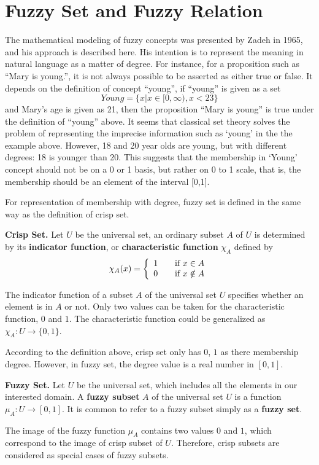 \section{Fuzzy Set and Fuzzy Relation}
\label{sec:FSAFR}
The mathematical modeling of fuzzy concepts was presented by Zadeh in 1965, and his approach is described here. His intention is to represent the meaning in natural language as a matter of degree. For instance, for a proposition such as ``Mary is young.'', it is not always possible to be asserted as either true or false. It depends on the definition of concept ``young'', if ``young'' is given as a set
\[Young = \{x|x \in [0,\infty), x<23\}\]
and Mary's age is given as 21, then the proposition ``Mary is young'' is true under the definition of ``young'' above. It seems that classical set theory solves the problem of representing the imprecise information such as `young' in the the example above. However, 18 and 20 year olds are young, but with different degrees: 18 is younger than 20. This suggests that the membership in `Young' concept should not be on a 0 or 1 basis, but rather on 0 to 1 scale, that is, the membership should be an element of the interval [0,1].

For representation of membership with degree, fuzzy set is defined in the same way as the definition of crisp set.

\begin{defin} \textbf{Crisp Set.} 
\label{def:CrispSet}
Let $U$ be the universal set, an ordinary subset $A$ of $U$ is determined by its \textbf{indicator function}, or \textbf{characteristic function} $\chi_A$ defined by
\[
  \chi_A(x) = \left\{ 
  \begin{array}{l l}
    1 & \quad \text{if $x \in A$}\\
    0 & \quad \text{if $x \notin A$}\\
  \end{array} \right.
\]
\end{defin}
The indicator function of a subset $A$ of the universal set $U$ specifies whether an element is in $A$ or not. Only two values can be taken for the characteristic function, $0$ and $1$. The characteristic function could be generalized as $\chi_A : U \rightarrow \{0,1\}$.

According to the definition above, crisp set only has $0$, $1$ as there membership degree. However, in fuzzy set, the degree value is a real number in $[0,1]$.  

\begin{defin} \textbf{Fuzzy Set.}
\label{def:FuzzySet}
Let $U$ be the universal set, which includes all the elements in our interested domain. A \textbf{fuzzy subset} $A$ of the universal set $U$ is a function $\mu_A : U \rightarrow [0,1]$. It is common to refer to a fuzzy subset simply as a \textbf{fuzzy set}.

\end{defin} 
The image of the fuzzy function $\mu_A$ contains two values $0$ and $1$, which correspond to the image of crisp subset of $U$. Therefore, crisp subsets are considered as special cases of fuzzy subsets.

